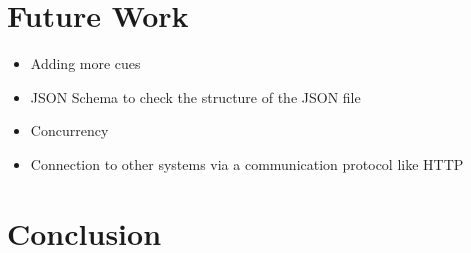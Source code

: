 \documentclass[conference]{IEEEtran}
\begin{document}
\section{Future Work}
\begin{itemize}
    \item Adding more cues
    \item JSON Schema to check the structure of the JSON file
    \item Concurrency
    \item Connection to other systems via a communication protocol like HTTP
\end{itemize}
\section{Conclusion}


\printbibliography
\end{document}
